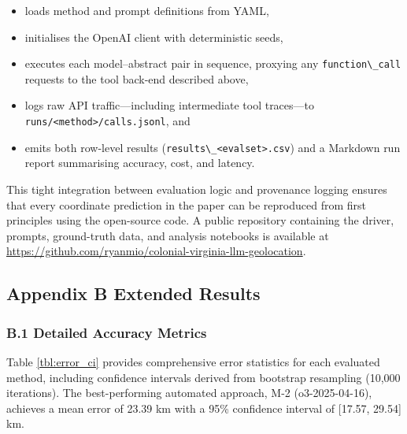\documentclass[
  10pt,
  twocolumn]{article}
\providecommand{\tightlist}{%
  \setlength{\itemsep}{0pt}\setlength{\parskip}{0pt}}
\begin{document}
\begin{itemize}
\tightlist
\item
  loads method and prompt definitions from YAML,
\item
  initialises the OpenAI client with deterministic seeds,
\item
  executes each model--abstract pair in sequence, proxying any
  \passthrough{\lstinline!function\_call!} requests to the tool back-end
  described above,
\item
  logs raw API traffic---including intermediate tool traces---to
  \passthrough{\lstinline!runs/<method>/calls.jsonl!}, and
\item
  emits both row-level results
  (\passthrough{\lstinline!results\_<evalset>.csv!}) and a Markdown run
  report summarising accuracy, cost, and latency.
\end{itemize}

This tight integration between evaluation logic and provenance logging
ensures that every coordinate prediction in the paper can be reproduced
from first principles using the open-source code. A public repository
containing the driver, prompts, ground-truth data, and analysis
notebooks is available at
\url{https://github.com/ryanmio/colonial-virginia-llm-geolocation}.

\subsection{Appendix B Extended
Results}\label{appendix-b-extended-results}

\subsubsection{B.1 Detailed Accuracy
Metrics}\label{b.1-detailed-accuracy-metrics}

Table \ref{tbl:error_ci} provides comprehensive error statistics for
each evaluated method, including confidence intervals derived from
bootstrap resampling (10,000 iterations). The best-performing automated
approach, M-2 (o3-2025-04-16), achieves a mean error of 23.39 km with a
95\% confidence interval of {[}17.57, 29.54{]} km.
\end{document}
